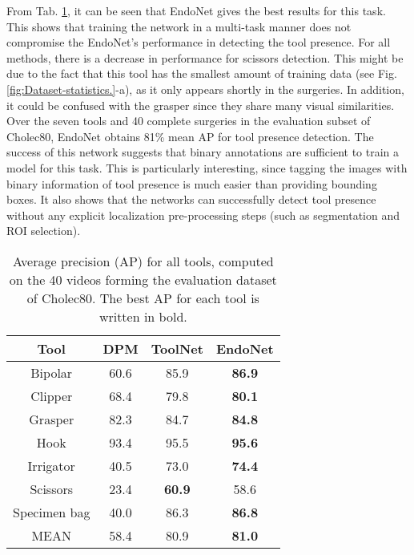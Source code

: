 \documentclass[journal]{IEEEtran} \usepackage{amssymb}
\begin{document}
From Tab. \ref{tab:Tool-presence-detection}, it can be seen that EndoNet gives the best results for this task.
This shows that training the network in a multi-task manner does not compromise 
the EndoNet's performance in detecting the tool presence. 
For all methods, there is a decrease in performance for scissors detection. This might be due to the fact that this tool has the smallest amount of training data (see Fig. \ref{fig:Dataset-statistics.}-a), as it only appears shortly in the surgeries. In addition, it could be confused with the grasper since they share many visual similarities.
Over the seven tools and 40 complete surgeries in the evaluation subset of Cholec80, EndoNet obtains
 81\% mean AP for tool presence detection. The
success of this network
suggests that  binary annotations are sufficient to train a model for this task.
This is particularly interesting, since
tagging the images with binary information of tool presence is
much easier than providing bounding boxes. It also shows
that the networks can successfully detect tool presence without any explicit localization pre-processing steps (such as segmentation and
ROI selection). 

\begin{table}
\begin{centering}
\begin{tabular}{|c|c|c|c|}
\hline 
Tool & DPM & ToolNet & EndoNet\tabularnewline
\hline 
\hline 
Bipolar & 60.6 & 85.9 & \textbf{86.9}\tabularnewline
\hline 
Clipper & 68.4 & 79.8 & \textbf{80.1}\tabularnewline
\hline 
Grasper & 82.3 & 84.7 & \textbf{84.8}\tabularnewline
\hline 
Hook & 93.4 & 95.5 & \textbf{95.6}\tabularnewline
\hline 
Irrigator & 40.5 & 73.0 & \textbf{74.4}\tabularnewline
\hline 
Scissors & 23.4 & \textbf{60.9} & 58.6\tabularnewline
\hline 
Specimen bag & 40.0 & 86.3 & \textbf{86.8}\tabularnewline
\hline 
MEAN & 58.4 & 80.9 & \textbf{81.0}\tabularnewline
\hline 
\end{tabular}
\par\end{centering}

\caption{Average precision (AP) for all tools, computed on the 40 videos forming the evaluation dataset of Cholec80. The best AP for each tool is written in bold.
\label{tab:Tool-presence-detection}}
\end{table}
\end{document}
